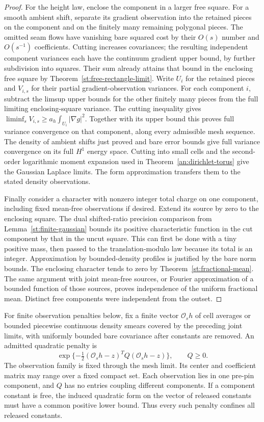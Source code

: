 \begin{proof}
For the height law, enclose the component in a larger
free square.  For a smooth ambient shift, separate
its gradient observation into the retained pieces
on the component and on the finitely many remaining
polygonal pieces.  The omitted seam flows have
vanishing bare squared cost by their $O(s)$ number
and $O(s^{-1})$ coefficients.  Cutting increases
covariances; the resulting independent component
variances each have the continuum gradient upper
bound, by further subdivision into squares.
Their sum already attains that bound in the
enclosing free square by
Theorem~\ref{st:free-rectangle-limit}.
Write $U_i$ for the retained pieces and $V_{i,s}$ for their
partial gradient-observation variances.
For each component $i$, subtract the limsup upper bounds for the
other finitely many pieces from the full limiting enclosing-square
variance. The cutting inequality gives
$\liminf_sV_{i,s}\ge a_h\int_{U_i}|\nabla g|^2$.
Together with its upper bound this proves full variance convergence on
that component, along every admissible mesh sequence.
The density of ambient shifts just proved and bare error bounds give
full variance convergence on its full $H^1$ energy space.  Cutting into small
cells and the second-order logarithmic moment
expansion used in Theorem~\ref{an:dirichlet-torus}
give the Gaussian Laplace limits.  The form
approximation transfers them to the stated density
observations.

Finally consider a character with nonzero integer
total charge on one component, including fixed
mean-free observations if desired.  Extend its
source by zero to the enclosing square.  The
dual shifted-ratio precision comparison from
Lemma~\ref{st:finite-gaussian} bounds its positive
characteristic function in the cut component by
that in the uncut square.  This can first be done
with a tiny positive mass, then passed to the
translation-modulo law because its total is an
integer.  Approximation by bounded-density profiles
is justified by the bare norm bounds.  The enclosing
character tends to zero by
Theorem~\ref{st:fractional-mean}.  The same argument
with joint mean-free sources, or Fourier
approximation of a bounded function of those
sources, proves independence of the uniform
fractional mean.  Distinct free components were
independent from the outset.
\end{proof}

For finite observation penalties below, fix a finite vector
$\mathcal O_s h$ of cell averages or bounded piecewise continuous
density smears covered by the preceding joint limits, with uniformly
bounded bare covariance after constants are removed.  An admitted
quadratic penalty is
\[
 \exp\{-\tfrac12(\mathcal O_s h-z)^TQ(\mathcal O_s h-z)\},
 \qquad Q\ge0.
\]
The observation family is fixed through the mesh limit.  Its center
and coefficient matrix may range over a fixed compact set.  Each
observation lies in one pre-pin component, and $Q$ has no entries
coupling different components.  If a
component constant is free, the induced quadratic form on the vector
of released constants must have a common positive lower bound.
Thus every such penalty confines all released constants.

